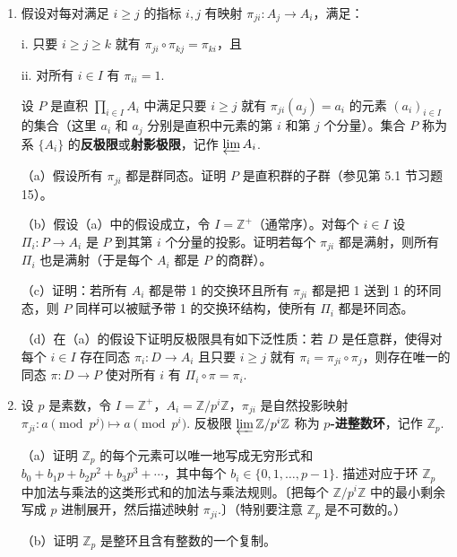 \begin{enumerate}
\noindent 我们现在发展反极限的概念。继续假设 \(I\) 是偏序集（但不必有向），对所有 \(i \in I\) 有群 \(A_i\).

\item 假设对每对满足 \(i \geq j\) 的指标 \(i, j\) 有映射 \(\pi_{ji} : A_j \to A_i\)，满足：

i. 只要 \(i \geq j \geq k\) 就有 \(\pi_{ji} \circ \pi_{kj} = \pi_{ki}\)，且

ii. 对所有 \(i \in I\) 有 \(\pi_{ii} = 1\).

设 \(P\) 是直积 \(\prod_{i \in I} A_i\) 中满足只要 \(i \geq j\) 就有 \(\pi_{ji}(a_j) = a_i\) 的元素 \((a_i)_{i \in I}\) 的集合（这里 \(a_i\) 和 \(a_j\) 分别是直积中元素的第 \(i\) 和第 \(j\) 个分量）。集合 \(P\) 称为系 \(\{A_i\}\) 的\textbf{反极限}或\textbf{射影极限}，记作 \(\varprojlim A_i\).

（a）假设所有 \(\pi_{ji}\) 都是群同态。证明 \(P\) 是直积群的子群（参见第 5.1 节习题 15）。

（b）假设（a）中的假设成立，令 \(I = \mathbb{Z}^+\)（通常序）。对每个 \(i \in I\) 设 \(\Pi_i : P \to A_i\) 是 \(P\) 到其第 \(i\) 个分量的投影。证明若每个 \(\pi_{ji}\) 都是满射，则所有 \(\Pi_i\) 也是满射（于是每个 \(A_i\) 都是 \(P\) 的商群）。

（c）证明：若所有 \(A_i\) 都是带 1 的交换环且所有 \(\pi_{ji}\) 都是把 1 送到 1 的环同态，则 \(P\) 同样可以被赋予带 1 的交换环结构，使所有 \(\Pi_i\) 都是环同态。

（d）在（a）的假设下证明反极限具有如下泛性质：若 \(D\) 是任意群，使得对每个 \(i \in I\) 存在同态 \(\pi_i : D \to A_i\) 且只要 \(i \geq j\) 就有 \(\pi_i = \pi_{ji}\circ\pi_j\)，则存在唯一的同态 \(\pi : D \to P\) 使对所有 \(i\) 有 \(\Pi_i \circ \pi = \pi_i\).

\item 设 \(p\) 是素数，令 \(I = \mathbb{Z}^+\)，\(A_i = \mathbb{Z}/p^i\mathbb{Z}\)，\(\pi_{ji}\) 是自然投影映射 \(\pi_{ji} : a \pmod{p^j} \mapsto a \pmod{p^i}\). 反极限 \(\varprojlim \mathbb{Z}/p^i\mathbb{Z}\) 称为 \textbf{\(p\)-进整数环}，记作 \(\mathbb{Z}_p\).

（a）证明 \(\mathbb{Z}_p\) 的每个元素可以唯一地写成无穷形式和 \(b_0 + b_1p + b_2p^2 + b_3p^3 + \cdots\)，其中每个 \(b_i \in \{0, 1, \ldots, p-1\}\). 描述对应于环 \(\mathbb{Z}_p\) 中加法与乘法的这类形式和的加法与乘法规则。〔把每个 \(\mathbb{Z}/p^i\mathbb{Z}\) 中的最小剩余写成 \(p\) 进制展开，然后描述映射 \(\pi_{ji}\).〕（特别要注意 \(\mathbb{Z}_p\) 是不可数的。）

（b）证明 \(\mathbb{Z}_p\) 是整环且含有整数的一个复制。


\end{enumerate}

